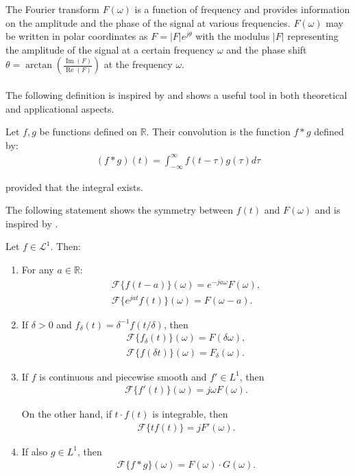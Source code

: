 \noindent
The Fourier transform $F(\omega)$ is a function of frequency and provides information on the amplitude and the phase of the signal at various frequencies. $F(\omega)$ may be written in polar coordinates as $F = |F|e^{j\theta}$ with the modulus $|F|$ representing the amplitude of the signal at a certain frequency $\omega$ and the phase shift $\theta = \arctan \left(\frac{\operatorname{Im}(F)}{\operatorname{Re}(F)} \right)$ at the frequency $\omega$.
\\ \\
The following definition is inspired by \cite{page 206, FAA} and shows a useful tool in both theoretical and applicational aspects.
\begin{definition} \label{def:Convol}
Let $f,g$ be functions defined on $\mathbb{R}$. Their convolution is the function $f*g$ defined by:
\begin{align*}
(f*g)(t) = \int_{-\infty}^\infty f(t-\tau) g(\tau) d\tau
\end{align*}

provided that the integral exists.
\end{definition}

\noindent
The following statement shows the symmetry between $f(t)$ and $F(\omega)$ and is inspired by \cite{page 214, FAA}.

\begin{theorem} \label{theorem:fund_sym_Fourier}
Let $f \in \mathcal{L}^1$. Then:

\begin{enumerate}[label=(\alph*)]
\item For any $a \in \mathbb{R}$: \label{theorem:fund_sym_Fourier_a}
\begin{align*}
\mathcal{F}\{f(t-a)\}(\omega) = e^{-ja\omega} F(\omega), \\
\mathcal{F}\{e^{jat}f(t)\}(\omega) = F(\omega - a).
\end{align*}

\item If $\delta > 0$ and $f_\delta(t)=\delta^{-1}f(t/\delta)$, then
\begin{align*}
\mathcal{F}\{f_\delta(t)\}(\omega) = F(\delta\omega), \\
\mathcal{F}\{f(\delta t)\}(\omega) = F_\delta(\omega).
\end{align*}

\item If $f$ is continuous and piecewise smooth and $f' \in L^1$, then
\begin{align*}
\mathcal{F}\{f'(t)\}(\omega) = j\omega F(\omega).
\end{align*}

On the other hand, if $t\cdot f(t)$ is integrable, then
\begin{align*}
\mathcal{F}\{tf(t)\} = j F'(\omega).
\end{align*}

\item If also $g \in L^1$, then
\begin{align*}
\mathcal{F}\{f*g\}(\omega) = F(\omega) \cdot G(\omega).
\end{align*}
\end{enumerate}
\end{theorem}

